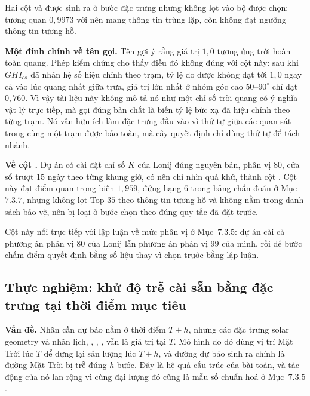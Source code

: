 Hai cột  và  được sinh ra ở bước đặc trưng nhưng
không lọt vào bộ được chọn:  tương quan $0{,}9973$ với
 nên mang thông tin trùng lặp, còn  không đạt ngưỡng
thông tin tương hỗ.

\textbf{Một đính chính về tên gọi.} Tên  gợi ý rằng giá trị $1{,}0$
tương ứng trời hoàn toàn quang. Phép kiểm chứng cho thấy điều đó không đúng với cột này: sau
khi $GHI_{cs}$ đã nhân hệ số hiệu chỉnh theo trạm, tỷ lệ đo được không đạt tới $1{,}0$
ngay cả vào lúc quang nhất giữa trưa, giá trị lớn nhất ở nhóm góc cao $50$--$90^\circ$ chỉ
đạt $0{,}760$. Vì vậy tài liệu này không mô tả nó như một chỉ số trời quang có ý nghĩa vật lý
trực tiếp, mà gọi đúng bản chất là biến tỷ lệ bức xạ đã hiệu chỉnh theo từng trạm. Nó
vẫn hữu ích làm đặc trưng đầu vào vì thứ tự giữa các quan sát trong cùng một trạm được bảo
toàn, mà cây quyết định chỉ dùng thứ tự để tách nhánh.

\textbf{Về cột .} Dự án có cài đặt chỉ số $K$ của Lonij đúng nguyên bản,
phân vị $80$, cửa sổ trượt $15$ ngày theo từng khung giờ, có  nên chỉ nhìn quá
khứ, thành cột . Cột này đạt điểm quan trọng biến $1{,}959$, đứng hạng $6$
trong bảng chẩn đoán ở Mục~$7.3.7$, nhưng không lọt Top $35$ theo thông tin tương hỗ và không nằm
trong danh sách bảo vệ, nên bị loại ở bước chọn theo đúng quy tắc đã đặt trước.

Cột này nối trực tiếp với lập luận về mức phân vị ở Mục~$7.3.5$: dự án cài cả phương án phân vị
$80$ của Lonij lẫn phương án phân vị $99$ của mình, rồi để bước chấm điểm quyết định bằng số
liệu thay vì chọn trước bằng lập luận.

\FloatBarrier
\subsection{Thực nghiệm: khử độ trễ cài sẵn bằng đặc trưng tại thời điểm mục tiêu}

\textbf{Vấn đề.} Nhãn cần dự báo nằm ở thời điểm $T{+}h$, nhưng các đặc trưng solar geometry
và nhãn lịch, , , , vẫn là giá trị tại $T$. Mô
hình do đó dùng vị trí Mặt Trời lúc $T$ để dựng lại sản lượng lúc $T{+}h$, và đường dự báo sinh
ra chính là đường Mặt Trời bị trễ đúng $h$ bước. Đây là hệ quả cấu trúc của bài toán, và tác
động của nó lan rộng vì cùng đại lượng đó cũng là mẫu số chuẩn hoá ở Mục~$7.3.5$.

